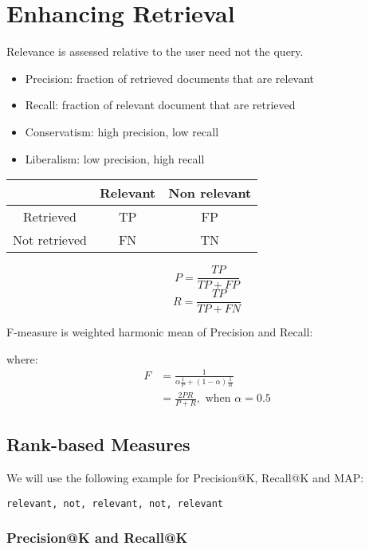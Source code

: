 \chapter{Enhancing Retrieval}

\begin{multicols*}{2}

\noindent Relevance is assessed relative to the user need not the query.

\begin{itemize}
    \item Precision: fraction of retrieved documents that are relevant
    \item Recall: fraction of relevant document that are retrieved
    \item Conservatism: high precision, low recall
    \item Liberalism: low precision, high recall
\end{itemize}

\begin{center}
\begin{tabular}{ |c|c c| } 
    \hline
     & Relevant & Non relevant \\
    \hline 
    Retrieved & TP & FP \\
    Not retrieved & FN & TN \\
    \hline
\end{tabular}
\end{center}

$$P=\frac{TP}{TP+FP}$$
$$R=\frac{TP}{TP+FN}$$

\noindent F-measure is weighted harmonic mean of Precision and Recall:

\noindent where:
\begin{equation*}
\begin{split}
    F &=\frac{1}{\alpha \frac{1}{P} + (1-\alpha)\frac{1}{R}} \\
    &= \frac{2PR}{P+R}, \text{ when } \alpha = 0.5
\end{split}
\end{equation*}

\section{Rank-based Measures}
\noindent We will use the following example for Precision@K, Recall@K and MAP:

\noindent \verb|relevant, not, relevant, not, relevant|

\subsection{Precision@K and Recall@K}


\end{multicols*}

